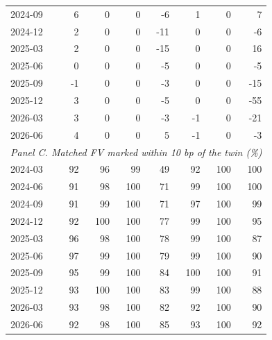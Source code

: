 \documentclass[12pt]{standalone}
\begin{document}
\begin{tabular}{lrrrrrrr}
2024-09 & 6 & 0 & 0 & -6 & 1 & 0 & 7 \\
2024-12 & 2 & 0 & 0 & -11 & 0 & 0 & -6 \\
2025-03 & 2 & 0 & 0 & -15 & 0 & 0 & 16 \\
2025-06 & 0 & 0 & 0 & -5 & 0 & 0 & -5 \\
2025-09 & -1 & 0 & 0 & -3 & 0 & 0 & -15 \\
2025-12 & 3 & 0 & 0 & -5 & 0 & 0 & -55 \\
2026-03 & 3 & 0 & 0 & -3 & -1 & 0 & -21 \\
2026-06 & 4 & 0 & 0 & 5 & -1 & 0 & -3 \\
\midrule\multicolumn{8}{l}{\emph{Panel C. Matched FV marked within 10 bp of the twin (\%)}} \\
2024-03 & 92 & 96 & 99 & 49 & 92 & 100 & 100 \\
2024-06 & 91 & 98 & 100 & 71 & 99 & 100 & 100 \\
2024-09 & 91 & 99 & 100 & 71 & 97 & 100 & 99 \\
2024-12 & 92 & 100 & 100 & 77 & 99 & 100 & 95 \\
2025-03 & 96 & 98 & 100 & 78 & 99 & 100 & 87 \\
2025-06 & 97 & 99 & 100 & 79 & 99 & 100 & 90 \\
2025-09 & 95 & 99 & 100 & 84 & 100 & 100 & 91 \\
2025-12 & 93 & 100 & 100 & 83 & 99 & 100 & 88 \\
2026-03 & 93 & 98 & 100 & 82 & 92 & 100 & 90 \\
2026-06 & 92 & 98 & 100 & 85 & 93 & 100 & 92 \\
\bottomrule\end{tabular}
\end{document}
